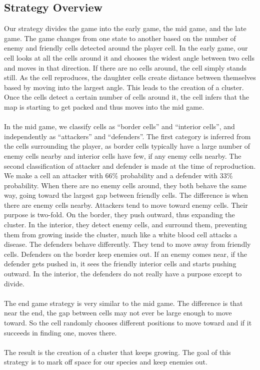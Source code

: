\subsection{Strategy Overview}
Our strategy divides the game into the early game, the mid game, and the late game. The game changes from one state to another based on the number of enemy and friendly cells detected around the player cell.
In the early game, our cell looks at all the cells around it and chooses the widest angle between two cells and moves in that direction. If there are no cells around, the cell simply stands still. As the cell reproduces, the daughter cells create distance between themselves based by moving into the largest angle. This leads to the creation of a cluster. Once the cells detect a certain number of cells around it, the cell infers that the map is starting to get packed and thus moves into the mid game.\\
\\
In the mid game, we classify cells as “border cells” and “interior cells”, and independently as “attackers” and “defenders”. The first category is inferred from the cells surrounding the player, as border cells typically have a large number of enemy cells nearby and interior cells have few, if any enemy cells nearby. The second classification of attacker and defender is made at the time of reproduction. We make a cell an attacker with 66\% probability and a defender with 33\% probability. When there are no enemy cells around, they both behave the same way, going toward the largest gap between friendly cells. The difference is when there are enemy cells nearby. Attackers tend to move toward enemy cells. Their purpose is two-fold. On the border, they push outward, thus expanding the cluster. In the interior, they detect enemy cells, and surround them, preventing them from growing inside the cluster, much like a white blood cell attacks a disease. The defenders behave differently. They tend to move away from friendly cells. Defenders on the border keep enemies out. If an enemy comes near, if the defender gets pushed in, it sees the friendly interior cells and starts pushing outward. In the interior, the defenders do not really have a purpose except to divide.\\
\\
The end game strategy is very similar to the mid game. The difference is that near the end, the gap between cells may not ever be large enough to move toward. So the cell randomly chooses different positions to move toward and if it succeeds in finding one, moves there.\\
\\
The result is the creation of a cluster that keeps growing. The goal of this strategy is to mark off space for our species and keep enemies out. 